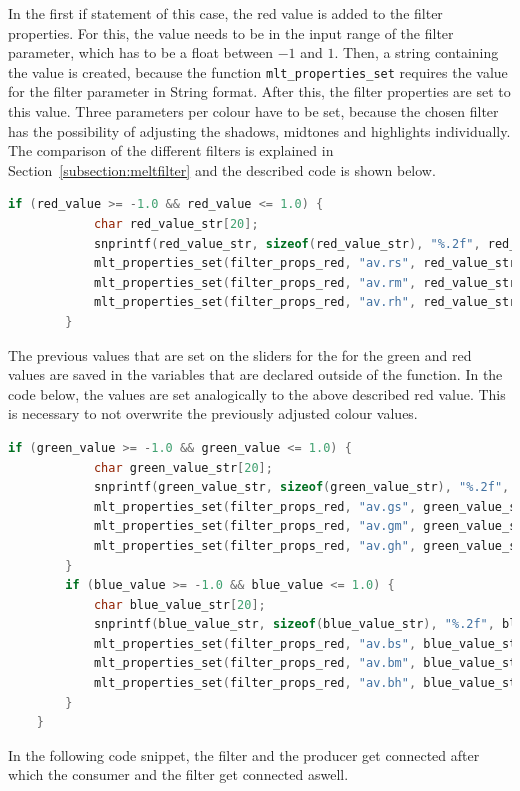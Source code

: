 \documentclass[../MasterThesis.tex]{subfiles}
\begin{document}
In the first if statement of this case, the red value is added to the filter properties. For this, the value needs to be in the input range of the filter parameter, which has to be a float between $-1$ and $1$. Then, a string containing the value is created, because the function \texttt{mlt\_properties\_set} requires the value for the filter parameter in String format. After this, the filter properties are set to this value. Three parameters per colour have to be set, because the chosen filter has the possibility of adjusting the shadows, midtones and highlights individually. 
The comparison of the different filters is explained in Section~\ref{subsection:meltfilter} and the described code is shown below.


\begin{lstlisting}[language=c, numbers=none, columns=fullflexible]
		if (red_value >= -1.0 && red_value <= 1.0) {
			char red_value_str[20]; 
			snprintf(red_value_str, sizeof(red_value_str), "%.2f", red_value);
			mlt_properties_set(filter_props_red, "av.rs", red_value_str);
			mlt_properties_set(filter_props_red, "av.rm", red_value_str);
			mlt_properties_set(filter_props_red, "av.rh", red_value_str);
		}	
\end{lstlisting}

The previous values that are set on the sliders for the for the green and red values are saved in the variables that are declared outside of the function. In the code below, the values are set analogically to the above described red value. This is necessary to not overwrite the previously adjusted colour values.
	
\begin{lstlisting}[language=c, numbers=none, columns=fullflexible]
		if (green_value >= -1.0 && green_value <= 1.0) {
			char green_value_str[20]; 
			snprintf(green_value_str, sizeof(green_value_str), "%.2f", green_value);
			mlt_properties_set(filter_props_red, "av.gs", green_value_str);
			mlt_properties_set(filter_props_red, "av.gm", green_value_str);	
			mlt_properties_set(filter_props_red, "av.gh", green_value_str);
		} 			
		if (blue_value >= -1.0 && blue_value <= 1.0) {
			char blue_value_str[20]; 
			snprintf(blue_value_str, sizeof(blue_value_str), "%.2f", blue_value);
			mlt_properties_set(filter_props_red, "av.bs", blue_value_str);
			mlt_properties_set(filter_props_red, "av.bm", blue_value_str);	
			mlt_properties_set(filter_props_red, "av.bh", blue_value_str);
		}					
	}
\end{lstlisting}

In the following code snippet, the filter and the producer get connected after which the consumer and the filter get connected aswell.
\end{document}
